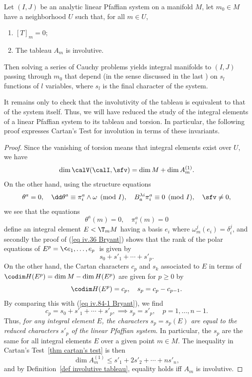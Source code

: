 \begin{thm}\label{thm 6.5.6 Ivey}\label{thm iv.5.16 Bryant}
    Let $(I,J)$ be an analytic linear Pfaffian system on a manifold $M$, let $m_0\in M$ have a neighborhood $U$ such that, for all $m\in U$,
    \begin{enumerate}
        \item $[T]_m=0$;
        \item The tableau $A_m$ is involutive.
    \end{enumerate}
    Then solving a series of Cauchy problems yields integral manifolds to $(I,J)$ passing through $m_0$ that depend (in the sense discussed in the last \sect) on $s_l$ functions of $l$ variables, where $s_l$ is the final character of the system.
\end{thm}
It remains only to check that the involutivity of the tableau is equivalent to that of the system itself. Thus, we will have reduced the study of the integral elements of a linear Pfaffian system to its tableau and torsion. In particular, the following proof expresses Cartan's Test for involution in terms of these invariants.
\begin{proof}
    Since the vanishing of torsion means that integral elements exist over $U$, we have 
    \[\dim \calV(\calI,\sfv)=\dim M+\dim A_m^{(1)}.\]
    On the other hand, using the structure equations 
    \[\theta^a=0,\quad \dd\theta^a\equiv \pi^a_i\wedge\omega\pmod{I},\quad B^{\lambda i}_a\pi^a_i\equiv 0\pmod{I},\quad \sfv\neq 0,\]
    we see that the equations 
    \[\theta^a(m)=0,\quad \pi^a_i(m)=0\]
    define an integral element $E<\T_m M$ having a basis $e_i$ where $\omega^j_m(e_i)=\delta_i^j$, and secondly the proof of (\ref{eq iv.36 Bryant}) shows that the rank of the polar equations of $E^p=\<e_1,\ldots,e_p\>$ is given by 
    \[s_0+s'_1+\cdots +s'_p.\label{eq iv.84-1 Bryant}\]
    On the other hand, the Cartan characters $c_p$ and $s_k$ associated to $E$ in terms of $\codim H(E^p)=\dim M-\dim H(E^p)$ are given for $p\geq 0$ by
    \[\codim H(E^p)=c_p,\quad s_p=c_p-c_{p-1}.\]
    By comparing this with (\ref{eq iv.84-1 Bryant}), we find
    \[c_p=s_0+s'_1+\cdots+s'_p,\implies \boxed{s_p=s'_p,\quad p=1,\ldots,n-1.}\]
    Thus, \emph{for any integral element $E$, the characters $s_p=s_p(E)$ are equal to the reduced characters $s'_p$ of the linear Pfaffian system}. In particular, the $s_p$ are the same for all integral elements $E$ over a given point $m\in M$. The inequality in Cartan's Test~\ref{thm cartan's test} is then 
    \[\dim A_m^{(1)}\leq s'_1+2s'_2+\cdots +ns'_n,\]
    and by Definition~\ref{def involutive tableau}, equality holds iff $A_m$ is involutive.
\end{proof}



